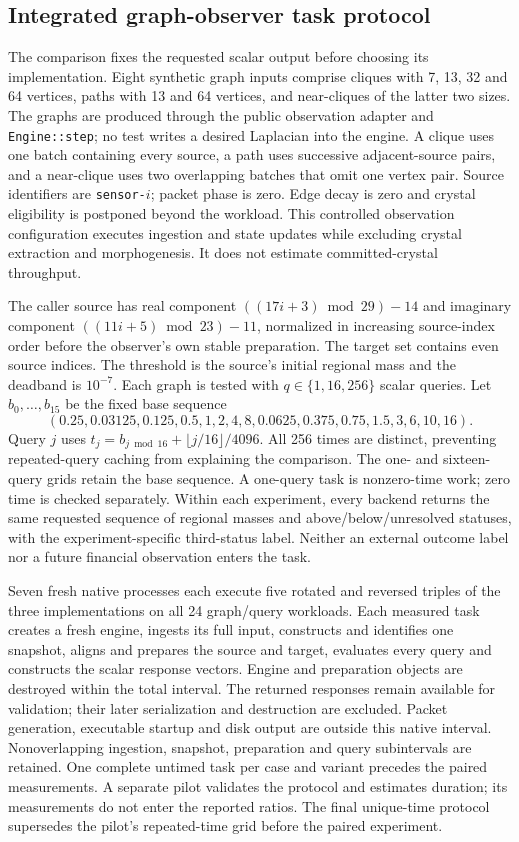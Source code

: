 \documentclass[11pt,a4paper]{article}
\theoremstyle{definition}\newtheorem{definition}[theorem]{Definition}
\begin{document}
\subsection{Integrated graph-observer task protocol}\label{sec:engineobserverprotocol}
The comparison fixes the requested scalar output before choosing its
implementation. Eight synthetic graph inputs comprise cliques with 7, 13, 32
and 64 vertices, paths with 13 and 64 vertices, and near-cliques of the latter
two sizes. The graphs are produced through the public observation adapter and
\texttt{Engine::step}; no test writes a desired Laplacian into the engine.
A clique uses one batch containing every source, a path uses successive
adjacent-source pairs, and a near-clique uses two overlapping batches that
omit one vertex pair. Source identifiers are \texttt{sensor-$i$}; packet phase
is zero. Edge decay is zero and crystal eligibility is postponed beyond the
workload. This controlled observation configuration executes ingestion and
state updates while excluding crystal extraction and morphogenesis. It does
not estimate committed-crystal throughput.

The caller source has real component $((17i+3)\bmod29)-14$ and imaginary
component $((11i+5)\bmod23)-11$, normalized in increasing source-index order
before the observer's own stable preparation. The target set contains even
source indices. The threshold is the source's initial regional mass and the
deadband is $10^{-7}$. Each graph is tested with $q\in\{1,16,256\}$ scalar
queries. Let $b_0,\ldots,b_{15}$ be the fixed base sequence
\[
 (0.25,0.03125,0.125,0.5,1,2,4,8,
   0.0625,0.375,0.75,1.5,3,6,10,16).
\]
Query $j$ uses $t_j=b_{j\bmod16}+\lfloor j/16\rfloor/4096$. All 256 times are distinct, preventing repeated-query caching from explaining the comparison. The one- and sixteen-query grids retain the base sequence. A one-query task is nonzero-time work; zero time is checked separately.
Within each experiment, every backend returns the same requested sequence of regional masses and
above/below/unresolved statuses, with the experiment-specific third-status label. Neither an external outcome label nor a
future financial observation enters the task.

Seven fresh native processes each execute five rotated and reversed triples
of the three implementations on all 24 graph/query workloads. Each measured
task creates a fresh engine, ingests its full input, constructs and identifies
one snapshot, aligns and prepares the source and target, evaluates every
query and constructs the scalar response vectors. Engine and preparation
objects are destroyed within the total interval. The returned responses remain
available for validation; their later serialization and destruction are
excluded. Packet generation, executable startup and disk output are outside
this native interval. Nonoverlapping ingestion, snapshot, preparation and
query subintervals are retained. One complete untimed task per case and variant
precedes the paired measurements. A separate pilot validates the protocol and
estimates duration; its measurements do not enter the reported ratios. The final unique-time protocol supersedes the pilot's repeated-time grid before the paired experiment.
\end{document}

